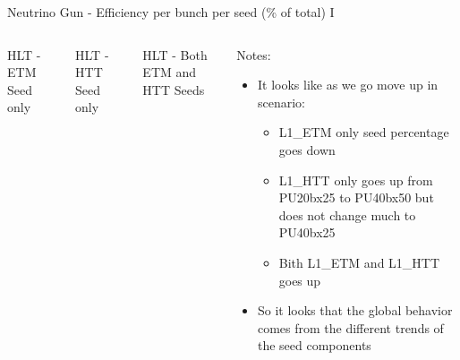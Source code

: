 \documentclass[8pt]{beamer}
\begin{document}
\begin{frame}{Neutrino Gun - Efficiency per bunch per seed (\% of total) I}

\begin{columns}

\begin{block}{HLT - ETM Seed only}
\centering

\resizebox{1.0\linewidth}{!}{  }

\end{block}

\begin{block}{HLT - HTT Seed only}
\centering
 
\resizebox{1.0\linewidth}{!}{  }

\end{block}

\begin{block}{HLT - Both ETM and HTT Seeds}
\centering

\resizebox{1.0\linewidth}{!}{  }

\end{block}

\begin{block}{Notes:}
\centering

\begin{itemize}
  \item It looks like as we go move up in scenario:
  \begin{itemize}
    \item L1\_ETM only seed percentage goes down
    \item L1\_HTT only goes up from PU20bx25 to PU40bx50 but does not change much to PU40bx25
    \item Bith L1\_ETM and L1\_HTT goes up 
  \end{itemize}
  \item So it looks that the global behavior comes from the different trends of the seed components 
\end{itemize}

\end{block}

\end{columns}

\end{frame}
\end{document}
